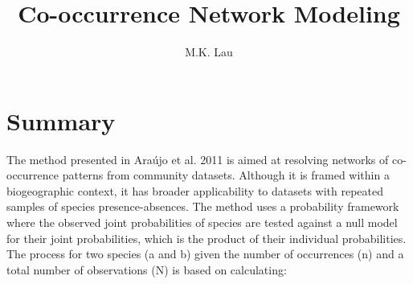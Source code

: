 \documentclass[12pt]{article}
\title{Co-occurrence Network Modeling}
\author{M.K. Lau}
\begin{document}
\maketitle

\setcounter{tocdepth}{3}  %
\tableofcontents

\section{Summary}
The method presented in Ara\' ujo et al. 2011 \cite{araujo2011} is aimed
at resolving networks of co-occurrence patterns from community
datasets. Although it is framed within a biogeographic context, it has
broader applicability to datasets with repeated samples of species
presence-absences. The method uses a probability framework where the
observed joint probabilities of species are tested against a null
model for their joint probabilities, which is the product of their
individual probabilities. The process for two species (a and b) given
the number of occurrences (n) and a total number of observations (N)
is based on calculating:
\end{document}
